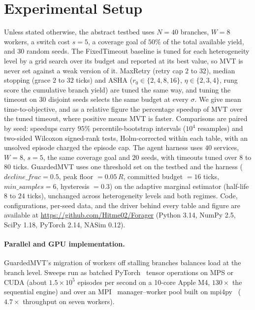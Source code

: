 \documentclass[runningheads]{llncs}
\newcommand{\RR}{R}
\begin{document}
\section{Experimental Setup}
\label{sec:setup}

Unless stated otherwise, the abstract testbed uses $N=40$ branches, $W=8$ workers, a
switch cost $s=5$, a coverage goal of $50\%$ of the total available yield, and $30$
random seeds. The FixedTimeout
baseline is tuned for each heterogeneity level by a grid search over its budget and
reported at its best value, so MVT is never set against a weak version of it. MaxRetry
(retry cap $2$ to $32$), median stopping (grace $2$ to $32$ ticks) and ASHA
($r_0\in\{2,4,8,16\}$, $\eta\in\{2,3,4\}$, rung score the cumulative branch yield) are tuned
the same way, and tuning the timeout on $30$ disjoint seeds selects the same budget at every
$\sigma$. We give
mean time-to-objective, and as a relative figure the percentage speedup of MVT over
the tuned timeout, where positive means MVT is faster. Comparisons are paired by seed:
speedups carry $95\%$ percentile-bootstrap intervals ($10^4$ resamples) and two-sided
Wilcoxon signed-rank tests, Holm-corrected within each table, with an unsolved episode
charged the episode cap. The agent harness uses $40$ services, $W=8$, $s=5$, the same
coverage goal and $20$ seeds, with timeouts tuned over $8$ to $80$ ticks. GuardedMVT uses
one threshold set on the testbed and the harness ($\textit{decline\_frac}=0.5$, peak floor
$=0.05\,\RR$, committed budget $=16$ ticks, $\textit{min\_samples}=6$, hysteresis $=0.3$) on
the adaptive marginal estimator (half-life $8$ to $24$ ticks), unchanged across
heterogeneity levels and both regimes. Code, configurations, per-seed data, and the
driver behind every table and figure are available at
\url{https://github.com/Hitme02/Forager} (Python 3.14, NumPy 2.5, SciPy 1.18,
PyTorch 2.14, NASim 0.12).

\paragraph{Parallel and GPU implementation.}\label{sec:parallel}
GuardedMVT's migration of workers off stalling branches balances load at the branch level.
Sweeps run as batched PyTorch~\cite{paszke2019pytorch} tensor operations on MPS or CUDA
(about $1.5\times10^{5}$ episodes per second on a 10-core Apple M4, $130\times$ the sequential
engine) and over an MPI~\cite{mpiforum2021} manager--worker pool built on
mpi4py~\cite{dalcin2011mpi4py} ($4.7\times$ throughput on seven workers).
\end{document}
